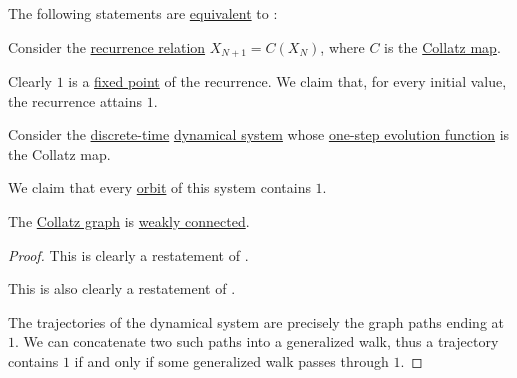 \begin{theorem}\label{thm:collatz_conjectures_equivalences}
  The following statements are \hyperref[def:logical_equivalence]{equivalent} to :
  \begin{thmenum}[series=thm:axiom_of_choice_equivalences]
     Consider the \hyperref[def:recurrence_relation]{recurrence relation} \( X_{N+1} = C(X_N) \), where \( C \) is the \hyperref[def:collatz_map]{Collatz map}.

    Clearly \( 1 \) is a \hyperref[def:dynamical_system_fixed_point]{fixed point} of the recurrence. We claim that, for every initial value, the recurrence attains \( 1 \).

     Consider the \hyperref[def:discrete_dynamical_system]{discrete-time} \hyperref[def:dynamical_system]{dynamical system} whose \hyperref[def:one_step_evolution_function]{one-step evolution function} is the Collatz map.

    We claim that every \hyperref[def:dynamical_system_trajectory]{orbit} of this system contains \( 1 \).

     The \hyperref[def:collatz_graph]{Collatz graph} is \hyperref[def:graph_connectedness/weak]{weakly connected}.
  \end{thmenum}
\end{theorem}
\begin{proof}
   This is clearly a restatement of .

   This is also clearly a restatement of .

   The trajectories of the dynamical system are precisely the graph paths ending at \( 1 \). We can concatenate two such paths into a generalized walk, thus a trajectory contains \( 1 \) if and only if some generalized walk passes through \( 1 \).
\end{proof}
